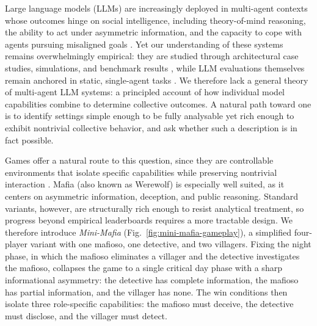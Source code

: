 \documentclass{article}
\begin{document}
Large language models (LLMs) are increasingly deployed in multi-agent contexts whose outcomes hinge on social intelligence, including theory-of-mind reasoning, the ability to act under asymmetric information, and the capacity to cope with agents pursuing misaligned goals \citep{gao2024large, guo2024large, wang2024survey}. Yet our understanding of these systems remains overwhelmingly empirical: they are studied through architectural case studies, simulations, and benchmark results \citep{hou2024egosocialarena}, while LLM evaluations themselves remain anchored in static, single-agent tasks \citep{costa2025moralsusceptibilityrobustnesspersona, banerjee2024vulnerability, pan2025benchmarks}. We therefore lack a general theory of multi-agent LLM systems: a principled account of how individual model capabilities combine to determine collective outcomes. A natural path toward one is to identify settings simple enough to be fully analysable yet rich enough to exhibit nontrivial collective behavior, and ask whether such a description is in fact possible.

Games offer a natural route to this question, since they are controllable environments that isolate specific capabilities while preserving nontrivial interaction \citep{silver2016mastering, huizinga1938homo}. Mafia (also known as Werewolf) is especially well suited, as it centers on asymmetric information, deception, and public reasoning. Standard variants, however, are structurally rich enough to resist analytical treatment, so progress beyond empirical leaderboards requires a more tractable design.
We therefore introduce \textit{Mini-Mafia} (Fig.~\ref{fig:mini-mafia-gameplay}), a simplified four-player variant with one mafioso, one detective, and two villagers. Fixing the night phase, in which the mafioso eliminates a villager and the detective investigates the mafioso, collapses the game to a single critical day phase with a sharp informational asymmetry: the detective has complete information, the mafioso has partial information, and the villager has none. The win conditions then isolate three role-specific capabilities: the mafioso must deceive, the detective must disclose, and the villager must detect.
\end{document}
